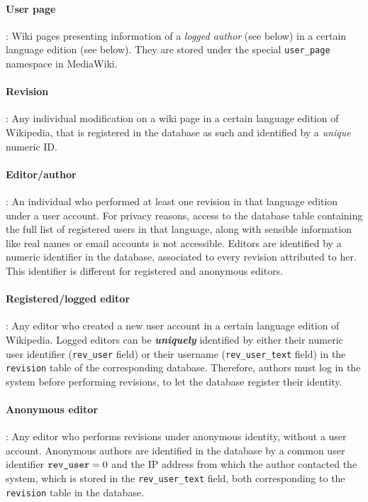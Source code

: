 \paragraph{User page}: Wiki pages presenting information of a \textit{logged author} (see below) in 
a certain language edition (see below). They are stored under the special \texttt{user\_page}
namespace in MediaWiki.

\paragraph{Revision}: Any individual modification on a wiki page in a certain
language edition of Wikipedia, that is registered in the database as such and identified
by a \textit{unique} numeric ID.

\paragraph{Editor/author}: An individual who performed at least one revision in that language
edition under a user account. For privacy reasons, access to the database
table containing the full list of registered users in that language, along with sensible information
like real names or email accounts is not accessible. Editors are identified by a numeric identifier 
in the database, associated to every revision attributed to her. This identifier is different
for registered and anonymous editors.

\paragraph{Registered/logged editor}: Any editor who created a new user account in a 
certain language edition of Wikipedia. Logged editors can be \textbf{\textit{uniquely}} identified by
either their numeric user identifier (\texttt{rev\_user} field) or their username (\texttt{rev\_user\_text}
field) in the \texttt{revision} table of the corresponding database. Therefore, authors
must log in the system before performing revisions, to let the database register
their identity.

\paragraph{Anonymous editor}: Any editor who performs revisions under anonymous identity,
without a user account. Anonymous authors are identified in the database by a common user identifier $\mbox{\texttt{rev\_user}}=0$
and the IP address from which the author contacted the system, which is stored in the
\texttt{rev\_user\_text} field, both corresponding to the \texttt{revision} table in the
database.

